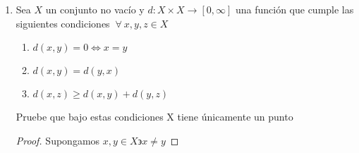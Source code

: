 \documentclass[12pt]{article}
\newcommand{\subscript}[2]{$#1 _ #2$}
\begin{document}
\begin{enumerate}[label=\textbf{\arabic*}.]
\begin{proof}
\begin{enumerate}[label=(\subscript{D}{{\arabic*}})]
\item Sean $x,y \in X$. Como $d$ es una métrica en $X \Rightarrow d(x,y) \geqslant 0$. Por otra parte, como $f$ es estrictamente creciente $f(t) \geqslant 0 \: \forall \: t\in [0,\infty]$. Por lo cual $(f \circ d) (x,y) = f(d(x,y)) \geqslant 0$
\item Sean $x,y \in X$. Por hipótesis $f(t) = 0 \Leftrightarrow t = 0 \: \forall \: t\in [0,\infty]$. Usando esto s.t.q.
\begin{equation*}
    (f \circ d) (x,y) = 0 \Leftrightarrow  f(d(x,y)) = 0 \Leftrightarrow d(x,y) = 0 \Leftrightarrow x = y
\end{equation*}
\item Sean $x,y \in X$. Como $d$ es métrica en $X$, note lo siguiente
\begin{equation*}
    (f \circ d) (x,y) =  f(d(x,y)) =  f(d(y,x)) = (f \circ d) (y,x) 
\end{equation*}
\item Sean $x,y,x \in X$. Notemos que, como $f$ es estrictamente creciente, y además subaditiva s.t.q
\begin{equation*}
    (f \circ d) (x,z) =  f(d(x,z)) \leqslant f(d(x,y)+d(y,z)) \leqslant f(d(x,y)) + f(d(y,z))
\end{equation*}
\begin{equation*}
    = (f \circ d) (x,y) + (f \circ d) (y,z) \Rightarrow (f \circ d) (x,z) \leqslant  (f \circ d) (x,y) + (f \circ d) (y,z) 
\end{equation*}
\end{enumerate} 
$\therefore f \circ d$ es una métrica en $X$
\end{proof}

\item Sea $X$ un conjunto no vacío y $d : X \times X \to  [0, \infty] $ una función que cumple las siguientes condiciones $\: \forall \: x, y , z \in X$
\begin{enumerate}
    \item $d(x,y)=0 \Leftrightarrow x = y$
    \item $d(x,y) = d(y,x)$
    \item $d(x, z) \geqslant d(x, y) + d(y, z)$
\end{enumerate}

Pruebe que bajo estas condiciones X tiene  únicamente un punto

\begin{proof}
    Supongamos $x, y \in X \backepsilon x \neq y$
    

\end{proof}
\end{enumerate}
\end{document}
